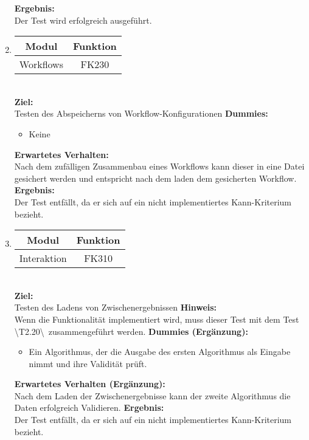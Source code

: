 \begin{enumerate}[align=left, leftmargin=4em, label={\textbf{\textbackslash T2.\arabic*\textbackslash}} ]
		\subitem \textbf{Ergebnis:}\\
		Der Test wird erfolgreich ausgeführt.
		\\\item \begin{tabular}{|c|c|}
			\hline Modul & Funktion \\
			\hline Workflows & FK230 \\
			\hline
		\end{tabular}\\
		\subitem \textbf{Ziel:}\\ Testen des Abspeicherns von Workflow-Konfigurationen
		\subitem \textbf{Dummies:} \begin{itemize}
			\item Keine
		\end{itemize}
		\subitem \textbf{Erwartetes Verhalten:}\\ Nach dem zufälligen Zusammenbau eines Workflows kann dieser in eine Datei gesichert werden und entspricht nach dem laden dem gesicherten Workflow.
		\subitem \textbf{Ergebnis:}\\
		Der Test entfällt, da er sich auf ein nicht implementiertes Kann-Kriterium bezieht.
		\\\item \begin{tabular}{|c|c|}
			\hline Modul & Funktion \\
			\hline Interaktion & FK310 \\
			\hline
		\end{tabular}\\
		\subitem \textbf{Ziel:}\\ Testen des Ladens von Zwischenergebnissen
		\subitem \textbf{Hinweis:}\\ Wenn die Funktionalität implementiert wird, muss dieser Test mit dem Test \textbackslash T2.20\textbackslash zusammengeführt werden.
		\subitem \textbf{Dummies (Ergänzung):}\begin{itemize}
			\item Ein Algorithmus, der die Ausgabe des ersten Algorithmus als Eingabe nimmt und ihre Validität prüft.
		\end{itemize}
		\subitem \textbf{Erwartetes Verhalten (Ergänzung):}\\ Nach dem Laden der Zwischenergebnisse kann der zweite Algorithmus die Daten erfolgreich Validieren.
		\subitem \textbf{Ergebnis:}\\
		Der Test entfällt, da er sich auf ein nicht implementiertes Kann-Kriterium bezieht.
	\end{enumerate}

